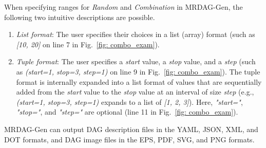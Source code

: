 When specifying ranges for {\it Random} and {\it Combination} in MRDAG-Gen, the following two intuitive descriptions are possible.
\begin{enumerate}
    \item {\it List format}: The user specifies their choices in a list (array) format (such as {\it [10, 20]} on line 7 in Fig.~\ref{fig: combo_exam}).
    \item {\it Tuple format}: The user specifies a {\it start} value, a {\it stop} value, and a {\it step} (such as {\it (start=1, stop=3, step=1)} on line 9 in Fig.~\ref{fig: combo_exam}). The tuple format is internally expanded into a list format of values that are sequentially added from the {\it start} value to the {\it stop} value at an interval of size {\it step} (e.g., {\it (start=1, stop=3, step=1)} expands to a list of {\it [1, 2, 3]}). Here, {\it "start="}, {\it "stop="}, and {\it "step="} are optional (line 11 in Fig.~\ref{fig: combo_exam}).
\end{enumerate}

MRDAG-Gen can output DAG description files in the YAML, JSON, XML, and DOT formats, and DAG image files in the EPS, PDF, SVG, and PNG formats.


